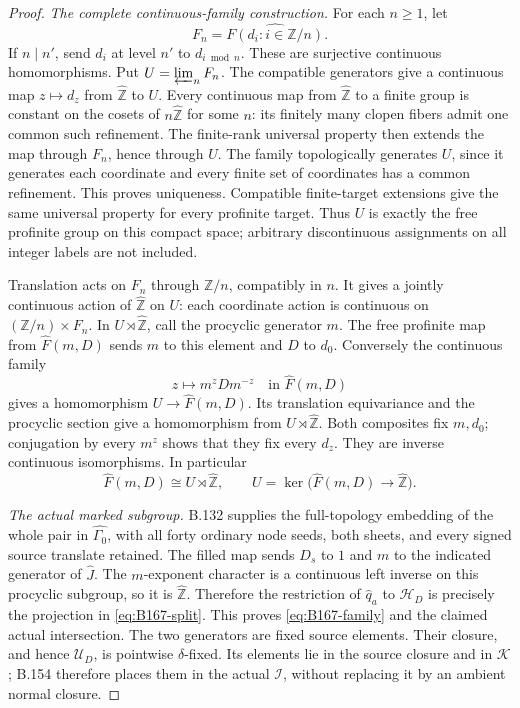 \begin{proof}
\emph{The complete continuous-family construction.}
For each \(n\ge1\), let
\[
 F_n=\widehat{F(d_i:i\in\mathbb Z/n)}.
\]
If \(n\mid n'\), send \(d_i\) at level \(n'\) to \(d_{i\bmod n}\).
These are surjective continuous homomorphisms. Put
\(U=\varprojlim_nF_n\). The compatible generators give a continuous
map \(z\mapsto d_z\) from \(\widehat{\mathbb Z}\) to \(U\).
Every continuous map from \(\widehat{\mathbb Z}\) to a finite group
is constant on the cosets of \(n\widehat{\mathbb Z}\) for some \(n\):
its finitely many clopen fibers admit one common such refinement.
The finite-rank universal property then extends the map through
\(F_n\), hence through \(U\).
The family topologically generates \(U\), since it generates each
coordinate and every finite set of coordinates has a common refinement.
This proves uniqueness. Compatible finite-target extensions give the
same universal property for every profinite target. Thus \(U\) is
exactly the free profinite group on this compact space; arbitrary
discontinuous assignments on all integer labels are not included.

Translation acts on \(F_n\) through \(\mathbb Z/n\), compatibly in \(n\).
It gives a jointly continuous action of \(\widehat{\mathbb Z}\) on
\(U\): each coordinate action is continuous on
\((\mathbb Z/n)\times F_n\). In \(U\rtimes\widehat{\mathbb Z}\), call
the procyclic generator \(m\).
The free profinite map from \(\widehat F(m,D)\) sends \(m\) to this
element and \(D\) to \(d_0\). Conversely the continuous family
\[
                 z\longmapsto m^zDm^{-z}
                 \quad\text{in }\widehat F(m,D)
\]
gives a homomorphism \(U\to\widehat F(m,D)\). Its translation
equivariance and the procyclic section give a homomorphism from
\(U\rtimes\widehat{\mathbb Z}\). Both composites fix \(m,d_0\);
conjugation by every \(m^z\) shows that they fix every \(d_z\).
They are inverse continuous isomorphisms. In particular
\begin{equation}\label{eq:B167-split}
 \widehat F(m,D)
   \cong U\rtimes\widehat{\mathbb Z},
 \qquad
 U=\ker\bigl(\widehat F(m,D)\longrightarrow\widehat{\mathbb Z}\bigr).
\end{equation}

\emph{The actual marked subgroup.}
B.132 supplies the full-topology embedding of the whole pair in
\(\widehat{\Gamma_0}\), with all forty ordinary node seeds, both
sheets, and every signed source translate retained.
The filled map sends \(D_s\) to \(1\) and \(m\) to the indicated
generator of \(\widehat J\). The \(m\)-exponent character is a
continuous left inverse on this procyclic subgroup, so it is
\(\widehat{\mathbb Z}\). Therefore the restriction of
\(\widehat q_a\) to \(\mathcal H_D\) is precisely the projection in
\eqref{eq:B167-split}. This proves \eqref{eq:B167-family} and the
claimed actual intersection. The two generators are fixed source
elements. Their closure, and hence \(\mathcal U_D\), is pointwise
\(\delta\)-fixed. Its elements lie in the source closure and in
\(\mathcal K\); B.154 therefore places them in the actual
\(\mathcal I\), without replacing it by an ambient normal closure.


\end{proof}
